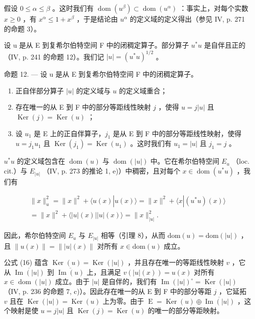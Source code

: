 假设 \(0 \leqslant \alpha \leqslant \beta\) 。这时我们有 \(\operatorname{dom}(u^{\beta}) \subset \operatorname{dom}(u^{\alpha})\) ：事实上，对每个实数 \(x \geqslant 0\) ，有 \(x^{\alpha} \leqslant 1 + x^{\beta}\) ，于是结论由 \(u^{\alpha}\) 的定义域的定义得出（参见 IV, p. 271 的命题 3）。

设 u 是从 E 到复希尔伯特空间 F 中的闭稠定算子。部分算子 \(u^{*}u\) 是自伴且正的（IV, p. 241 的命题 12）。我们记 \(|u| = (u^{*}u)^{1/2}\) 。

命题 12. --- 设 u 是从 E 到复希尔伯特空间 F 中的闭稠定算子。

\begin{enumerate}
\def\labelenumi{\alph{enumi})}
\item
  正自伴部分算子 \(|u|\) 的定义域与 \(u\) 的定义域重合；
\item
  存在唯一的从 E 到 F 中的部分等距线性映射 \(j\) ，使得 \(u = j|u|\) 且 \(\operatorname{Ker}(j) = \operatorname{Ker}(u)\) ；
\item
  设 \(u_{1}\) 是 E 上的正自伴算子，\(j_{1}\) 是从 E 到 F 中的部分等距线性映射，使得 \(u = j_{1}u_{1}\) 且 \(\operatorname{Ker}(j_{1}) = \operatorname{Ker}(u_{1})\) 。这时我们有 \(u_{1} = |u|\) 且 \(j_{1} = j\) 。
\end{enumerate}

\(u^{*}u\) 的定义域包含在 \(\operatorname{dom}(u)\) 与 \(\operatorname{dom}(|u|)\) 中。它在希尔伯特空间 \(E_{u}\) （loc. cit.）与 \(E_{|u|}\) （IV, p. 273 的推论 1, e)）中稠密，且对每个 \(x \in \operatorname{dom}(u^{*}u)\) ，我们有

\[
\begin{array}{c} \| x \| _ {u} ^ {2} = \| x \| ^ {2} + \langle u (x) | u (x) \rangle = \| x \| ^ {2} + \langle x | (u ^ {*} u) (x) \rangle \\ = \| x \| ^ {2} + \langle | u | (x) | | u | (x) \rangle = \| x \| _ {| u |} ^ {2}. \end{array}\tag{16}
\]

因此，希尔伯特空间 \(E_{u}\) 与 \(E_{|u|}\) 相等（引理 8），从而 \(\text{dom}(u) = \text{dom}(|u|)\) ，且 \(\|u(x)\| = \||u|(x)\|\) 对所有 \(x \in \text{dom}(u)\) 成立。

公式 (16) 蕴含 \(\operatorname{Ker}(u) = \operatorname{Ker}(|u|)\) ，并且存在唯一的等距线性映射 \(v\) ，它从 \(\overline{\operatorname{Im}(|u|)}\) 到 \(\overline{\operatorname{Im}(u)}\) 上，且满足 \(v(|u|(x)) = u(x)\) 对所有 \(x \in \operatorname{dom}(|u|)\) 成立。由于 \(|u|\) 是自伴的，我们有 \(\operatorname{Im}(|u|)^{\circ} = \operatorname{Ker}(|u|)\) （IV, p. 236 的命题 7, c)）。因此存在唯一的从 E 到 F 中的部分等距 \(j\) ，它延拓 \(v\) 且在 \(\operatorname{Ker}(|u|) = \operatorname{Ker}(u)\) 上为零。由于 \(\operatorname{E} = \operatorname{Ker}(u) \oplus \overline{\operatorname{Im}(|u|)}\) ，这个映射是使 \(u = j|u|\) 且 \(\operatorname{Ker}(j) = \operatorname{Ker}(u)\) 的唯一的部分等距映射。

